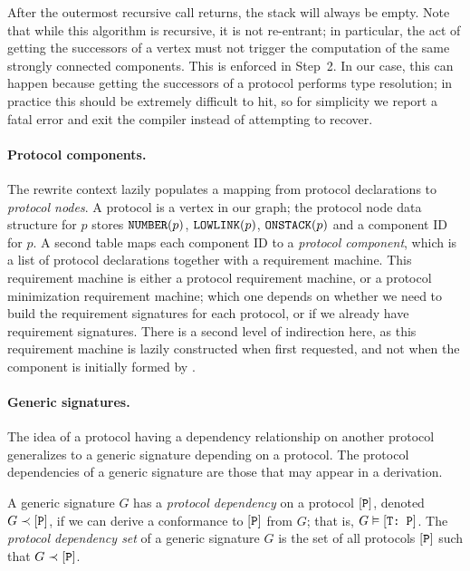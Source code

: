 \documentclass[../generics]{subfiles}
\begin{document}
After the outermost recursive call returns, the stack will always be empty. Note that while this algorithm is recursive, it is not re-entrant; in particular, the act of getting the successors of a vertex must not trigger the computation of the same strongly connected components. This is enforced in Step~2. In our case, this can happen because getting the successors of a protocol performs type resolution; in practice this should be extremely difficult to hit, so for simplicity we report a fatal error and exit the compiler instead of attempting to recover.

\paragraph{Protocol components.} The rewrite context lazily populates a mapping from protocol declarations to \emph{protocol nodes}. A protocol is a vertex in our graph; the protocol node data structure for $p$ stores $\texttt{NUMBER}(p)$, $\texttt{LOWLINK}(p)$, $\texttt{ONSTACK}(p)$ and a component ID for $p$. A second table maps each component ID to a \emph{protocol component}, which is a list of protocol declarations together with a requirement machine. This requirement machine is either a protocol requirement machine, or a protocol minimization requirement machine; which one depends on whether we need to build the requirement signatures for each protocol, or if we already have requirement signatures. There is a second level of indirection here, as this requirement machine is lazily constructed when first requested, and not when the component is initially formed by .

\paragraph{Generic signatures.}
The idea of a protocol having a dependency relationship on another protocol generalizes to a generic signature depending on a protocol. The protocol dependencies of a generic signature are those that may appear in a derivation.

\begin{definition}
A generic signature $G$ has a \emph{protocol dependency} on a protocol $[\texttt{P}]$, denoted \index{$\prec$}$G\prec[\texttt{P}]$, if we can derive a conformance to $[\texttt{P}]$ from $G$; that is, $G\vDash[\texttt{T:~P}]$. The \emph{protocol dependency set} of a generic signature $G$ is the set of all protocols $[\texttt{P}]$ such that $G\prec[\texttt{P}]$.

\end{definition}
\end{document}
